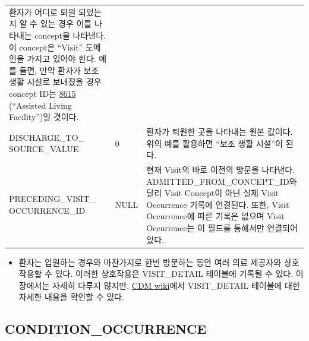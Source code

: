 \documentclass[10.5pt]{book}
\providecommand{\tightlist}{%
  \setlength{\itemsep}{0pt}\setlength{\parskip}{0pt}}
\theoremstyle{definition}
\theoremstyle{definition}
\theoremstyle{definition}
\theoremstyle{remark}
\begin{document}
\begin{longtable}[]{@{}lll@{}}
\begin{minipage}[t]{0.48\columnwidth}
환자가 어디로 퇴원 되었는지 알 수 있는 경우 이를 나타내는 concept을
나타낸다. 이 concept은 ``Visit'' 도메인을 가지고 있어야 한다. 예를 들면,
만약 환자가 보조 생활 시설로 보내졌을 경우 concept ID는
\href{http://athena.ohdsi.org/search-terms/terms/8615}{8615} (``Assisted
Living Facility'')일 것이다.\strut
\end{minipage}\tabularnewline
\begin{minipage}[t]{0.28\columnwidth}\raggedright\strut
DISCHARGE\_TO\_ SOURCE\_VALUE\strut
\end{minipage} & \begin{minipage}[t]{0.16\columnwidth}\raggedright\strut
0\strut
\end{minipage} & \begin{minipage}[t]{0.48\columnwidth}\raggedright\strut
환자가 퇴원한 곳을 나타내는 원본 값이다. 위의 예를 활용하면 ``보조 생활
시설''이 된다.\strut
\end{minipage}\tabularnewline
\begin{minipage}[t]{0.28\columnwidth}\raggedright\strut
PRECEDING\_VISIT\_ OCCURRENCE\_ID\strut
\end{minipage} & \begin{minipage}[t]{0.16\columnwidth}\raggedright\strut
NULL\strut
\end{minipage} & \begin{minipage}[t]{0.48\columnwidth}\raggedright\strut
현재 Visit의 바로 이전의 방문을 나타낸다. ADMITTED\_FROM\_CONCEPT\_ID와
달리 Visit Concept이 아닌 실제 Visit Occurrence 기록에 연결된다. 또한,
Visit Occurrence에 따른 기록은 없으며 Visit Occurrence는 이 필드를
통해서만 연결되어 있다.\strut
\end{minipage}\tabularnewline
\bottomrule
\end{longtable}

\begin{itemize}
\tightlist
\item
  환자는 입원하는 경우와 마찬가지로 한번 방문하는 동안 여러 의료
  제공자와 상호 작용할 수 있다. 이러한 상호작용은 VISIT\_DETAIL 테이블에
  기록될 수 있다. 이 장에서는 자세히 다루지 않지만,
  \href{https://github.com/OHDSI/CommonDataModel/wiki/VISIT_DETAIL}{CDM
  wiki}에서 VISIT\_DETAIL 테이블에 대한 자세한 내용을 확인할 수 있다.
\end{itemize}

\subsection{CONDITION\_OCCURRENCE}\label{conditionOccurrence}
\end{document}
